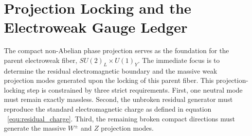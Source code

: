 \documentclass[11pt]{article}
\begin{document}
\section{Projection Locking and the Electroweak Gauge Ledger}
\label{sec:pr2_projection_locking_electroweak_gauge_ledger}

The compact non-Abelian phase projection serves as the foundation for the parent electroweak fiber, $SU(2)_L\times U(1)_Y$. The immediate focus is to determine the residual electromagnetic boundary and the massive weak projection modes generated upon the locking of this parent fiber. This projection-locking step is constrained by three strict requirements. First, one neutral mode must remain exactly massless. Second, the unbroken residual generator must reproduce the standard electromagnetic charge as defined in equation ~\ref{equ:residual_charge}. Third, the remaining broken compact directions must generate the massive \(W^\pm\) and \(Z\) projection modes.
\end{document}
